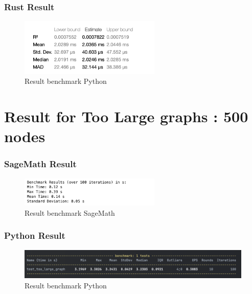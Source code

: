 \subsubsection*{Rust Result}
\begin{figure}[!h]
    \centering
    \includegraphics[width=0.60\textwidth]{images/benchmark/large_graph/benchmark_large_graph_rust}
    \caption{Result benchmark Python}
    \label{fig:benchmark-large-graph-rust}
\end{figure}


\section{Result for Too Large graphs : 500 nodes}\label{sec:result-for-too-large-graphs}

\subsubsection*{SageMath Result}
\begin{figure}[!h]
    \centering
    \includegraphics[width=0.60\textwidth]{images/benchmark/too_large_graph/benchmark_too_large_graph_sagemath}
    \caption{Result benchmark SageMath}
    \label{fig:benchmark-too-large-graph-sagemath}
\end{figure}

\subsubsection*{Python Result}
\begin{figure}[!h]
    \centering
    \includegraphics[width=1\textwidth]{images/benchmark/too_large_graph/benchmark_too_large_graph_python}
    \caption{Result benchmark Python}
    \label{fig:benchmark-too-large-graph-python}
\end{figure}

